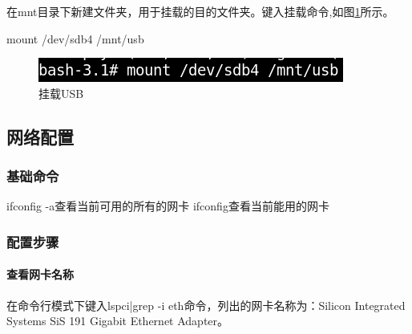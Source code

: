 \documentclass[paper=a4,fontsize=11pt]{article}
\begin{document}
	在mnt目录下新建文件夹，用于挂载的目的文件夹。键入挂载命令,如图\ref{mountusbdisk}所示。
	
	mount /dev/sdb4 /mnt/usb
	
	\begin{figure}[htbp]
		\centering
		\includegraphics[scale=0.7]{mountusbdisk.png}
		\caption{挂载USB}
		\label{mountusbdisk}
	\end{figure}
	
	
	
	
	
	
	\subsection{网络配置}
	
	\subsubsection{基础命令}
	
	\noindent ifconfig -a查看当前可用的所有的网卡\newline
	ifconfig查看当前能用的网卡
	
	
	
	
	\subsubsection{配置步骤}
	
	\paragraph{查看网卡名称}
	在命令行模式下键入lspci|grep -i eth命令，列出的网卡名称为：Silicon Integrated Systems SiS 191 Gigabit Ethernet Adapter。
	
\end{document}
